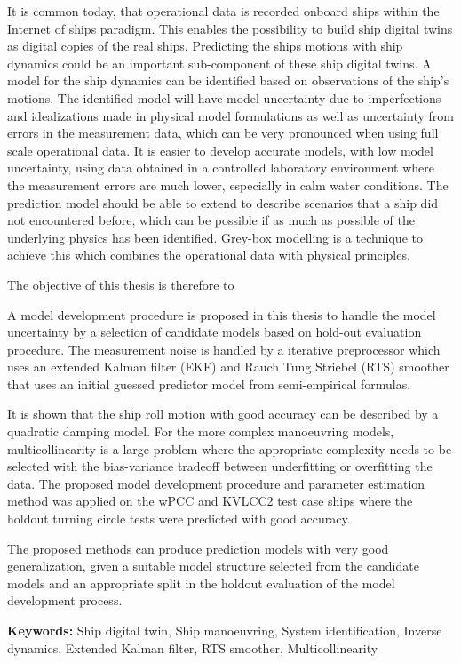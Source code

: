 
It is common today, that operational data is recorded onboard ships within the Internet of ships paradigm. This enables the possibility to build ship digital twins as digital copies of the real ships. Predicting the ships motions with ship dynamics could be an important sub-component of these ship digital twins. A model for the ship dynamics can be identified based on observations of the ship's motions. 
The identified model will have model uncertainty due to imperfections and idealizations made in physical model formulations as well as uncertainty from errors in the measurement data, which can be very pronounced when using full scale operational data. It is easier to develop accurate models, with low model uncertainty, using data obtained in a controlled laboratory environment where the measurement errors are much lower, especially in calm water conditions. The prediction model should be able to extend to describe scenarios that a ship did not encountered before, which can be possible if as much as possible of the underlying physics has been identified. Grey-box modelling is a technique to achieve this which combines the operational data with physical principles.  
 
The objective of this thesis is therefore to 
\noindent \objective 

A model development procedure is proposed in this thesis to handle the model uncertainty by a selection of candidate models based on hold-out evaluation procedure. The measurement noise is handled by a iterative preprocessor which uses an extended Kalman filter (EKF) and Rauch Tung Striebel (RTS) smoother that uses an initial guessed predictor model from semi-empirical formulas.

It is shown that the ship roll motion with good accuracy can be described by a quadratic damping model. For the more complex manoeuvring models, multicollinearity is a large problem where the appropriate complexity needs to be selected with the bias-variance tradeoff between underfitting or overfitting the data. 
The proposed model development procedure and parameter estimation method was applied on the wPCC and KVLCC2 test case ships where the holdout turning circle tests were predicted with good accuracy.

The proposed methods can produce prediction models with very good generalization, given a suitable model structure selected from the candidate models and an appropriate split in the holdout evaluation of the model development process. 

\vspace{0.1cm}
\textbf{Keywords:} Ship digital twin, Ship manoeuvring, System identification, Inverse dynamics, Extended Kalman filter, RTS smoother, Multicollinearity

